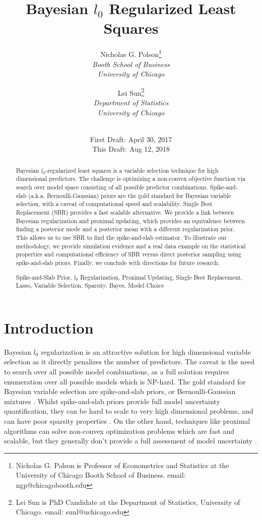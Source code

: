 \documentclass[11pt]{article}%
\title{Bayesian $l_0$ Regularized Least Squares}
\author{Nicholas G. Polson\footnote{Nicholas G. Polson is Professor of Econometrics and Statistics at the University of Chicago Booth School of Business. email: ngp@chicagobooth.edu}\\
\textit{Booth School of Business}\\
\textit{University of Chicago}
\and
Lei Sun\footnote{Lei Sun is PhD Candidate at the Department of Statistics, University of Chicago. email: sunl@uchicago.edu}\\
\textit{Department of Statistics}\\
\textit{University of Chicago}\\
\\
}
\date{First Draft: April 30, 2017\\
This Draft: Aug 12, 2018}
\numberwithin{equation}{section}
\theoremstyle{plain}
\begin{document}
\maketitle
\begin{abstract}
\noindent
Bayesian $l_0$-regularized least squares is a variable selection technique for high dimensional predictors.  The challenge is optimizing a non-convex objective function via search over model space consisting of all possible predictor combinations.  Spike-and-slab (a.k.a. Bernoulli-Gaussian) priors are the gold standard for Bayesian variable selection, with a caveat of computational speed and scalability. Single Best Replacement (SBR) provides a fast scalable alternative. We provide a link between Bayesian regularization and proximal updating, which provides an equivalence between finding a posterior mode and a posterior mean with a different regularization prior. This allows us to use SBR to find the spike-and-slab estimator. To illustrate our methodology, we provide simulation evidence and a real data example on the statistical properties and computational efficiency of SBR versus direct posterior sampling using spike-and-slab priors.  Finally, we conclude with directions for future research.

\vspace{0.5pc}

Spike-and-Slab Prior, $l_0$ Regularization, Proximal Updating, Single Best Replacement, Lasso, Variable Selection, Sparsity, Bayes, Model Choice
\end{abstract}

\newpage

\section{Introduction}

Bayesian $l_0$ regularization is an attractive solution for high dimensional variable selection as it directly penalizes the number of predictors.  The caveat is the need to search over all possible model combinations, as a full solution requires enumeration over all possible models which is NP-hard.  The gold standard for Bayesian variable selection are spike-and-slab priors, or Bernoulli-Gaussian mixtures \citep{mitchell1988, george1993, scott2014}.  Whilst spike-and-slab priors provide full model uncertainty quantification, they can be hard to scale to very high dimensional problems, and can have poor sparsity properties \citep{amini2012}.  On the other hand, techniques like proximal algorithms \citep{polson2015proximal, polson2017proximal} can solve non-convex optimization problems which are fast and scalable, but they generally don't provide a full assessment of model uncertainty \citep{jeffreys1961,hans2009,scott2010,li2010bayesian,marjanovic2013}.
\end{document}
